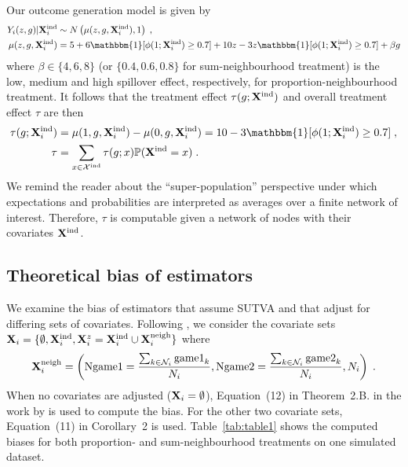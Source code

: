 \documentclass[10pt]{article}
\begin{document}
Our outcome generation model is given by
\begin{align*}
Y_i(z,g)|\Xind_i &\sim N\left(\mu(z,g,\Xind_i),1\right) \;, \\
\mu(z,g,\Xind_i) &= 5 + 6\mathbbm{1}[\phi(1;\Xind_i)\geq 0.7] + 10z - 3z\mathbbm{1}[\phi(1;\Xind_i)\geq0.7] + \beta g
\end{align*}
where $\beta\in\{4,6,8\}$ (or $\{0.4,0.6,0.8\}$ for sum-neighbourhood treatment) is the low, medium and high spillover effect, respectively, for proportion-neighbourhood treatment. It follows that the treatment effect $\tau(g;
\mathbf{X}^{\text{ind}})$ and overall treatment effect $\tau$ are then
\begin{align*}
\tau(g;\Xind_i) &= \mu(1,g,\Xind_i) - \mu(0,g,\Xind_i) = 10 - 3\mathbbm{1}[\phi(1;\Xind_i)\geq0.7] \;, \\
\tau &= \sum_{x\in\calX^\text{ind}}\tau(g;x)\P(\Xind=x) \;.
\end{align*}
We remind the reader about the ``super-population'' perspective \parencite{Imbens:2015} under which expectations and probabilities are interpreted as averages over a finite network of interest. Therefore, $\tau$ is computable given a network of nodes with their covariates $\mathbf{X}^{\text{ind}}$.

\subsection{Theoretical bias of estimators}

We examine the bias of estimators that assume SUTVA and that adjust for differing sets of covariates. Following \textcite{Forastiere:2021}, we consider the covariate sets $\mathbf{X}_i=\{\emptyset,\mathbf{X}^{\text{ind}}_i,\mathbf{X}_i^z=\mathbf{X}^{\text{ind}}_i\cup\mathbf{X}^{\text{neigh}}_i\}$ where
\[
\mathbf{X}^{\text{neigh}}_i=\left(\text{Ngame1}=\frac{\sum_{k\in\mathcal{N}_i}\text{game1}_k}{N_i},\text{Ngame2}=\frac{\sum_{k\in\mathcal{N}_i}\text{game2}_k}{N_i},N_i\right) \;.
\]
When no covariates are adjusted ($\mathbf{X}_i=\emptyset$), Equation~(12) in Theorem~2.B. in the work by \textcite{Forastiere:2021} is used to compute the bias. For the other two covariate sets, Equation~(11) in Corollary~2 is used. Table~\ref{tab:table1} shows the computed biases for both proportion- and sum-neighbourhood treatments on one simulated dataset.
\\
\end{document}
